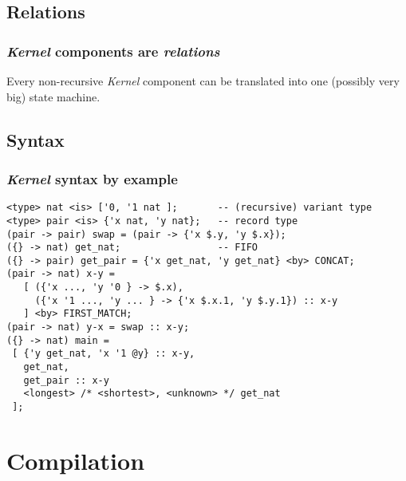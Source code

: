 \documentclass[utf8]{beamer}
\newcommand{\Kernel}{\textit{Kernel}}
\newcommand{\mypause}{\pause}
\begin{document}
\subsection{Relations}
\begin{frame}
  \frametitle{\Kernel{} components are \emph{relations}}
  \begin{center}
    
  \end{center}
  Every non-recursive \Kernel{} component can be translated into one
  (possibly very big) state machine.
\end{frame}

\subsection{Syntax}

\begin{frame}[fragile]
\frametitle{\Kernel{} syntax by example}
\footnotesize \mypause
\verb+<type> nat <is> ['0, '1 nat ];       -- (recursive) variant type+\\[-0.06cm] \mypause
\verb+<type> pair <is> {'x nat, 'y nat};   -- record type+\\[0.1cm]\mypause
\verb+(pair -> pair) swap = (pair -> {'x $.y, 'y $.x});+ \\[0.1cm] \mypause
\verb+({} -> nat) get_nat;                 -- FIFO+\\[0.1cm]\mypause
\verb+({} -> pair) get_pair = {'x get_nat, 'y get_nat} <by> CONCAT; +\\[0.1cm] \mypause
\verb+(pair -> nat) x-y = +\\[-0.06cm]
\verb+   [ ({'x ..., 'y '0 } -> $.x), +\\[-0.06cm]
\verb+     ({'x '1 ..., 'y ... } -> {'x $.x.1, 'y $.y.1}) :: x-y +\\[-0.06cm]
\verb+   ] <by> FIRST_MATCH; + \\[0.1cm]\mypause
\verb+(pair -> nat) y-x = swap :: x-y; +\\[0.1cm] \mypause
\verb+({} -> nat) main = +\\[-0.06cm]
\verb+ [ {'y get_nat, 'x '1 @y} :: x-y, +\\[-0.06cm]
\verb+   get_nat, +\\[-0.06cm]
\verb+   get_pair :: x-y  +\\[-0.06cm]
\verb+   <longest> /* <shortest>, <unknown> */ get_nat +\\[-0.1cm]
\verb+ ]; +
\end{frame}


\section{Compilation}
\end{document}

